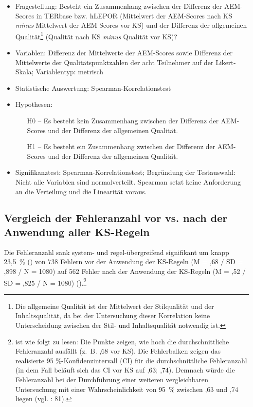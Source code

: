 \begin{itemize}
\item Fragestellung: Besteht ein Zusammenhang zwischen der Differenz der AEM-Scores in TERbase bzw. hLEPOR (Mittelwert der AEM-Scores nach KS \textit{minus} Mittelwert der AEM-Scores vor KS) und der Differenz der allgemeinen Qualität\footnote{{{{Die allgemeine Qualität ist der Mittelwert der Stilqualität und der Inhaltsqualität, da bei der Untersuchung dieser Korrelation keine Unterscheidung zwischen der Stil- und Inhaltsqualität notwendig ist.}}}} (Qualität nach KS \textit{minus} Qualität vor KS)?
\item Variablen: Differenz der Mittelwerte der AEM-Scores sowie Differenz der Mittelwerte der Qualitätspunktzahlen der acht Teilnehmer auf der Likert-Skala; Variablentyp: metrisch
\item Statistische Auswertung: Spearman-Korrelationstest
\item Hypothesen:
  \begin{itemize}[align=left]
  \item [H0 --] Es besteht kein Zusammenhang zwischen der Differenz der AEM-Scores und der Differenz der allgemeinen Qualität.

  \item [H1 --] Es besteht ein Zusammenhang zwischen der Differenz der AEM-Scores und  der Differenz der allgemeinen Qualität.
  \end{itemize}

\item Signifikanztest: Spearman-Korrelationstest; Begründung der Testauswahl: Nicht alle Variablen sind normalverteilt. Spearman setzt keine Anforderung an die Verteilung und die Linearität voraus.
\end{itemize}

\subsection{Vergleich der Fehleranzahl vor vs. nach der Anwendung aller KS-Regeln}
\label{sec:5.2.1}
Die Fehleranzahl sank system- und regel-übergreifend signifikant um knapp 23,5~\% () von 738 Fehlern vor der Anwendung der KS-Regeln (M = ,68 / SD = ,898 / N = 1080) auf 562 Fehler nach der Anwendung der KS-Regeln (M = ,52 / SD = ,825 / N = 1080) ().\footnote{ ist wie folgt zu lesen: Die Punkte zeigen, wie hoch die durchschnittliche Fehleranzahl ausfällt (z.~B. ,68 vor KS). Die Fehlerbalken zeigen das realisierte 95 \%-Konfidenzintervall (CI) für die durchschnittliche Fehleranzahl (in dem Fall beläuft sich das CI vor KS auf ,63; ,74). Demnach würde die Fehleranzahl bei der Durchführung einer weiteren vergleichbaren Untersuchung mit einer Wahrscheinlichkeit von 95~\% zwischen ,63 und ,74 liegen (vgl. \citealt{Eckstein2008}: 81).}


